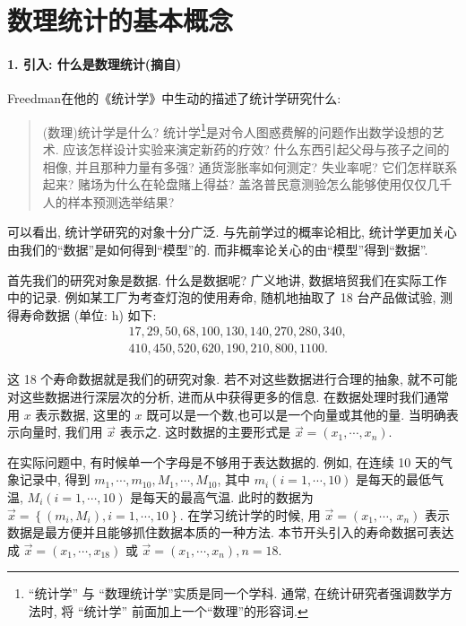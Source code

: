 \section{数理统计的基本概念}

\paragraph{1. 引入: 什么是数理统计(摘自\cite{probpku})}

Freedman在他的《统计学》中生动的描述了统计学研究什么: 
\begin{quote}
    (数理)统计学是什么? 统计学\footnote{``统计学'' 与 ``数理统计学''实质是同一个学科. 通常, 在统计研究者强调数学方法时, 将 ``统计学'' 前面加上一个``数理''的形容词.}是对令人图惑费解的问题作出数学设想的艺术. 应该怎样设计实验来演定新药的疗效? 什么东西引起父母与孩子之间的相像, 并且那种力量有多强? 通货澎胀率如何测定? 失业率呢? 它们怎样联系起来? 赌场为什么在轮盘賭上得益? 盖洛普民意测验怎么能够使用仅仅几千人的样本预测选举结果?
\end{quote}
可以看出, 统计学研究的对象十分广泛. 与先前学过的概率论相比, 统计学更加关心由我们的``数据''是如何得到``模型''的. 而非概率论关心的由``模型''得到``数据''. 

首先我们的研究对象是数据. 什么是数据呢? 广义地讲, 数据培贸我们在实际工作中的记录. 例如某工厂为考查灯泡的使用寿命, 随机地抽取了 18 台产品做试验, 测得寿命数据 (单位: h) 如下:
$$
\begin{aligned}
& 17,29,50,68,100,130,140,270,280,340, \\
& 410,450,520,620,190,210,800,1100 .
\end{aligned}
$$

这 18 个寿命数据就是我们的研究对象. 若不对这些数据进行合理的抽象, 就不可能对这些数据进行深层次的分析, 进而从中获得更多的信息. 在数据处理时我们通常用 $x$ 表示数据, 这里的 $x$ 既可以是一个数,也可以是一个向量或其他的量. 当明确表示向量时, 我们用 $\vec x$ 表示之. 这时数据的主要形式是 $\vec x=\left(x_1, \cdots, x_n\right)$.

在实际问题中, 有时候单一个字母是不够用于表达数据的. 例如, 在连续 10 天的气象记录中, 得到 $m_1, \cdots, m_{10}, M_1, \cdots, M_{10}$, 其中 $m_i(i=1, \cdots, 10)$ 是每天的最低气温, $M_i(i=1, \cdots, 10)$ 是每天的最高气温. 此时的数据为 $\vec x=\left\{\left(m_i, M_i\right), i=1, \cdots, 10\right\}$. 在学习统计学的时候, 用 $\vec x=\left(x_1, \cdots\right.$, $\left.x_n\right)$ 表示数据是最方便并且能够抓住数据本质的一种方法. 本节开头引入的寿命数据可表达成 $\vec x=\left(x_1, \cdots, x_{18}\right)$ 或 $\vec x=\left(x_1, \cdots, x_n\right), n=18$.

